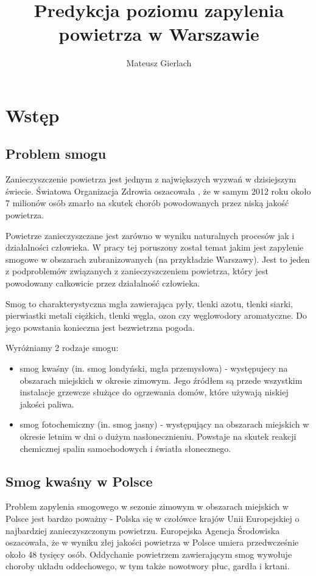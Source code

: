 \documentclass[a4paper,12pt,twoside,openany]{report}
\title{Predykcja poziomu zapylenia powietrza w Warszawie}
\author{Mateusz Gierlach}
\begin{document}
\maketitle

\chapter{Wstęp}

\section{Problem smogu}
Zanieczyszczenie powietrza jest jednym z największych wyzwań w dzisiejszym świecie. Światowa Organizacja Zdrowia oszacowała \cite{z1}, że w samym 2012 roku około 7 milionów osób zmarło na skutek chorób powodowanych przez niską jakość powietrza. 

Powietrze zanieczyszczane jest zarówno w wyniku naturalnych procesów jak i działalności człowieka. W pracy tej poruszony został temat jakim jest zapylenie smogowe w obszarach zubranizowanych (na przykładzie Warszawy). Jest to jeden z podproblemów związanych z zanieczyszczeniem powietrza, który jest powodowany całkowicie przez działalność człowieka.

Smog to charakterystyczna mgła zawierająca pyły, tlenki azotu, tlenki siarki, pierwiastki metali ciężkich, tlenki węgla, ozon czy węglowodory aromatyczne. Do jego powstania konieczna jest bezwietrzna pogoda.

Wyróżniamy 2 rodzaje smogu:
\begin{itemize}
	\item smog kwaśny (in. smog londyński, mgła przemysłowa) - występujecy na obszarach miejskich w okresie zimowym. Jego źródłem są przede wszystkim instalacje grzewcze służące do ogrzewania domów, które używają niskiej jakości paliwa.

	\item smog fotochemiczny (in. smog jasny)  - występujący na obszarach miejskich w okresie letnim w dni o dużym nasłonecznieniu. Powstaje na skutek reakcji chemicznej spalin samochodowych i światła słonecznego.
\end{itemize}

\section{Smog kwaśny w Polsce}

Problem zapylenia smogowego w sezonie zimowym w obszarach miejskich w Polsce jest bardzo poważny - Polska się w czołówce krajów Unii Europejskiej o najbardziej zanieczyszczonym powietrzu. Europejska Agencja Środowiska oszacowała, że w wyniku złej jakości powietrza w Polsce umiera przedwcześnie około 48 tysięcy osób.\cite{z2} Oddychanie powietrzem zawierającym smog wywołuje choroby układu oddechowego, w tym także nowotwory płuc, gardła i krtani.
\end{document}
